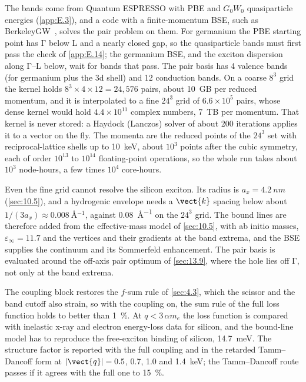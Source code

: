 The bands come from Quantum ESPRESSO with PBE and $G_0W_0$ quasiparticle energies (\cref{app:E.3}), and a code with a finite-momentum BSE, such as BerkeleyGW~\cite{deslippe2012berkeleygw}, solves the pair problem on them. For germanium the PBE starting point has $\mathrm{\Gamma}$ below L and a nearly closed gap, so the quasiparticle bands must first pass the check of \cref{app:E.14}; the germanium BSE, and the exciton dispersion along $\mathrm{\Gamma}$--L below, wait for bands that pass. The pair basis has 4 valence bands (for germanium plus the 3d shell) and 12 conduction bands. On a coarse $8^3$ grid the kernel holds $8^3\times4\times12 = 24{,}576$ pairs, about \SI{10}{GB} per reduced momentum, and it is interpolated to a fine $24^3$ grid of $6.6\times10^5$ pairs, whose dense kernel would hold $4.4\times10^{11}$ complex numbers, \SI{7}{TB} per momentum. That kernel is never stored: a Haydock (Lanczos) solver of about 200 iterations applies it to a vector on the fly. The momenta are the reduced points of the $24^3$ set with reciprocal-lattice shells up to \SI{10}{keV}, about $10^3$ points after the cubic symmetry, each of order $10^{13}$ to $10^{14}$ floating-point operations, so the whole run takes about $10^3$ node-hours, a few times $10^4$ core-hours.

Even the fine grid cannot resolve the silicon exciton. Its radius is $a_x = \SI{4.2}{nm}$ (\cref{sec:10.5}), and a hydrogenic envelope needs a $\vect{k}$ spacing below about $1/(3a_x) \approx \SI{0.008}{\angstrom^{-1}}$, against \SI{0.08}{\angstrom^{-1}} on the $24^3$ grid. The bound lines are therefore added from the effective-mass model of \cref{sec:10.5}, with ab initio masses, $\varepsilon_\infty = 11.7$ and the vertices and their gradients at the band extrema, and the BSE supplies the continuum and its Sommerfeld enhancement. The pair basis is evaluated around the off-axis pair optimum of \cref{sec:13.9}, where the hole lies off $\mathrm{\Gamma}$, not only at the band extrema.

The coupling block restores the $f$-sum rule of \cref{sec:4.3}, which the scissor and the band cutoff also strain, so with the coupling on, the sum rule of the full loss function holds to better than \SI{1}{\percent}. At $q < 3\,\alpha m_e$ the loss function is compared with inelastic x-ray and electron energy-loss data for silicon, and the bound-line model has to reproduce the free-exciton binding of silicon, \SI{14.7}{meV}. The structure factor is reported with the full coupling and in the retarded Tamm--Dancoff form at $|\vect{q}| = 0.5$, 0.7, 1.0 and \SI{1.4}{keV}; the Tamm--Dancoff route passes if it agrees with the full one to \SI{15}{\percent}.

